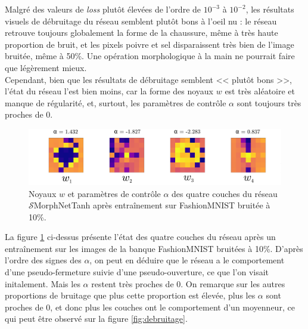 \vspace{-0.8mm}
Malgré des valeurs de \textit{loss} plutôt élevées de l'ordre de $10^{-3}$ à $10^{-2}$, les résultats visuels de débruitage du réseau semblent plutôt bons à l'oeil nu : le réseau retrouve toujours globalement la forme de la chaussure, même à très haute proportion de bruit, et les pixels poivre et sel disparaissent très bien de l'image bruitée, même à 50\%. Une opération morphologique à la main ne pourrait faire que légèrement mieux. \\

\vspace{-1.0mm}
\noindent Cependant, bien que les résultats de débruitage semblent << plutôt bons >>, l'état du réseau l'est bien moins, car la forme des noyaux $w$ est très aléatoire et manque de régularité, et, surtout, les paramètres de contrôle $\alpha$ sont toujours très proches de 0. \\

\begin{figure}[htp]
  \begin{center}
    \includegraphics[width=0.80\linewidth]{parts/4-analyse_des_reseaux/others/figures/aaaaa.pdf}
    \vspace{-1.6mm}
    \caption{ \centering Noyaux $w$ et paramètres de contrôle $\alpha$ des quatre couches du réseau $\mathcal{S}$MorphNetTanh après entraînement sur FashionMNIST bruitée à 10\%.}
    \label{fig:aaaaa}
  \end{center}
\end{figure}

\vspace{-2.6mm}
La figure \ref{fig:aaaaa} ci-dessus présente l'état des quatre couches du réseau après un entraînement sur les images de la banque FashionMNIST bruitées à 10\%. D'après l'ordre des signes des $\alpha$, on peut en déduire que le réseau a le comportement d'une pseudo-fermeture suivie d'une pseudo-ouverture, ce que l'on visait initalement. Mais les $\alpha$ restent très proches de 0. On remarque sur les autres proportions de bruitage que plus cette proportion est élevée, plus les $\alpha$ sont proches de 0, et donc plus les couches ont le comportement d'un moyenneur, ce qui peut être observé sur la figure \ref{fig:debruitage}.
